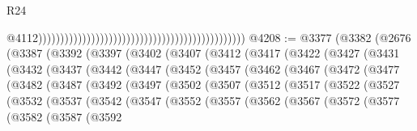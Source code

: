 \begin{lexlean}{R24}
\begin{coremodule}
                                                                                                  @4112)))))))))))))))))))))))))))))))))))))))))))))))
@4208 := @3377
    (@3382
      (@2676
        (@3387
          (@3392
            (@3397
              (@3402
                (@3407
                  (@3412
                    (@3417
                      (@3422
                        (@3427
                          (@3431
                            (@3432
                              (@3437
                                (@3442
                                  (@3447
                                    (@3452
                                      (@3457
                                        (@3462
                                          (@3467
                                            (@3472
                                              (@3477
                                                (@3482
                                                  (@3487
                                                    (@3492
                                                      (@3497
                                                        (@3502
                                                          (@3507
                                                            (@3512
                                                              (@3517
                                                                (@3522
                                                                  (@3527
                                                                    (@3532
                                                                      (@3537
                                                                        (@3542
                                                                          (@3547
                                                                            (@3552
                                                                              (@3557
                                                                                (@3562
                                                                                  (@3567
                                                                                    (@3572
                                                                                      (@3577
                                                                                        (@3582
                                                                                          (@3587
                                                                                            (@3592

\end{coremodule}
\end{lexlean}
